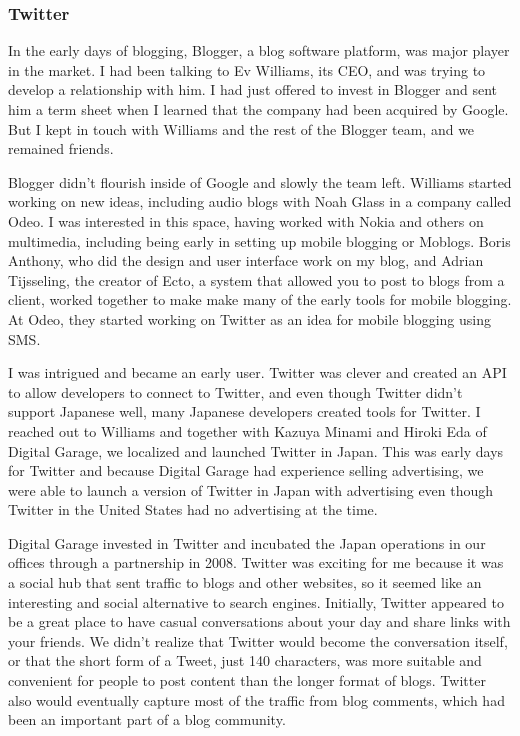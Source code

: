 \subsubsection{Twitter}

In the early days of blogging, Blogger, a blog software platform, was major player in the market. I had been talking to Ev Williams, its CEO, and was trying to develop a relationship with him. I had just offered to invest in Blogger and sent him a term sheet when I learned that the company had been acquired by Google. But I kept in touch with Williams and the rest of the Blogger team, and we remained friends.

Blogger didn't flourish inside of Google and slowly the team left. Williams started working on new ideas, including audio blogs with Noah Glass in a company called Odeo. I was interested in this space, having worked with Nokia and others on multimedia, including being early in setting up mobile blogging or Moblogs. Boris Anthony, who did the design and user interface work on my blog, and Adrian Tijsseling, the creator of Ecto, a system that allowed you to post to blogs from a client, worked together to make make many of the early tools for mobile blogging. At Odeo, they started working on Twitter as an idea for mobile blogging using SMS.

I was intrigued and became an early user. Twitter was clever and created an \ac{API} to allow developers to connect to Twitter, and even though Twitter didn't support Japanese well, many Japanese developers created tools for Twitter. I reached out to Williams and together with Kazuya Minami and Hiroki Eda of Digital Garage, we localized and launched Twitter in Japan. This was early days for Twitter and because Digital Garage had experience selling advertising, we were able to launch a version of Twitter in Japan with advertising even though Twitter in the United States had no advertising at the time.

Digital Garage invested in Twitter and incubated the Japan operations in our offices through a partnership in 2008. Twitter was exciting for me because it was a social hub that sent traffic to blogs and other websites, so it seemed like an interesting and social alternative to search engines. Initially, Twitter appeared to be a great place to have casual conversations about your day and share links with your friends. We didn't realize that Twitter would become the conversation itself, or that the short form of a Tweet, just 140 characters, was more suitable and convenient for people to post content than the longer format of blogs. Twitter also would eventually capture most of the traffic from blog comments, which had been an important part of a blog community. 

